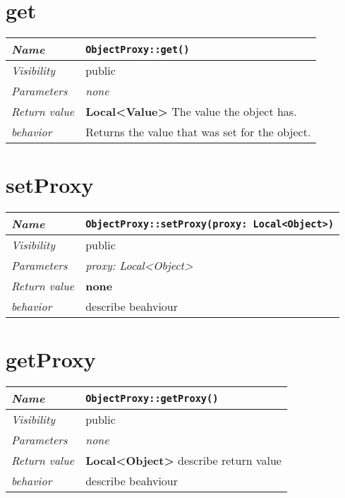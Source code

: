  \section{get}
\begin{longtable}{p{3cm} @{\hskip 1cm} p{12cm}}
 \hline
\textit{Name} & \texttt{ObjectProxy::get()}\\
\hline
 \textit{Visibility} & public\\
\hline
\textit{Parameters} & \textit{none}\\
\hline
\textit{Return value} & \textbf{Local<Value>} The value the object has.\\
  \hline
 \textit{behavior} & Returns the value that was set for the object.\\
\hline
\end{longtable} \pagebreak
 \section{setProxy}
\begin{longtable}{p{3cm} @{\hskip 1cm} p{12cm}}
 \hline
\textit{Name} & \texttt{ObjectProxy::setProxy(proxy: Local<Object>)}\\
\hline
 \textit{Visibility} & public\\
\hline
\textit{Parameters} & \textit{proxy: Local<Object>}\\
\hline
\textit{Return value} & \textbf{none}\\
  \hline
 \textit{behavior} & describe beahviour \\
\hline
\end{longtable} \pagebreak
 \section{getProxy}
\begin{longtable}{p{3cm} @{\hskip 1cm} p{12cm}}
 \hline
\textit{Name} & \texttt{ObjectProxy::getProxy()}\\
\hline
 \textit{Visibility} & public\\
\hline
\textit{Parameters} & \textit{none}\\
\hline
\textit{Return value} & \textbf{Local<Object>} describe return value\\
  \hline
 \textit{behavior} & describe beahviour \\
\hline
\end{longtable} \pagebreak
